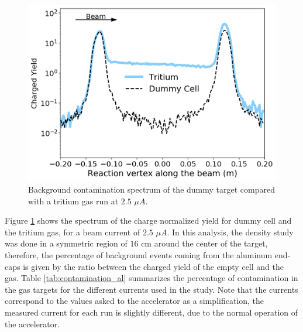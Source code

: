 \documentclass[final,5p,times,twocolumn,balance]{elsarticle}
\begin{document}
\begin{figure}[h]
 \centering
 \includegraphics[width=\linewidth]{images/contamination.pdf}
  \caption{Background contamination spectrum of the dummy target compared with a tritium gas run at $2.5$ $\mu A$.}
  \label{fig:bk_empty}
\end{figure}

Figure \ref{fig:bk_empty} shows the spectrum of the charge normalized yield for dummy cell and the tritium gas, for a beam current of $2.5$ $\mu A$. In this analysis, the density study was done in a symmetric region of $16$ cm around the center of the target, therefore, the percentage of background events coming from the aluminum end-caps is given by the ratio between the charged yield of the empty cell and the gas. Table \ref{tab:contamination_al} summarizes the percentage of contamination in the gas targets for the different currents used in the study. Note that the currents correspond to the values asked to the accelerator as a simplification, the measured current for each run is slightly different, due to the normal operation of the accelerator.
 
\end{document}
